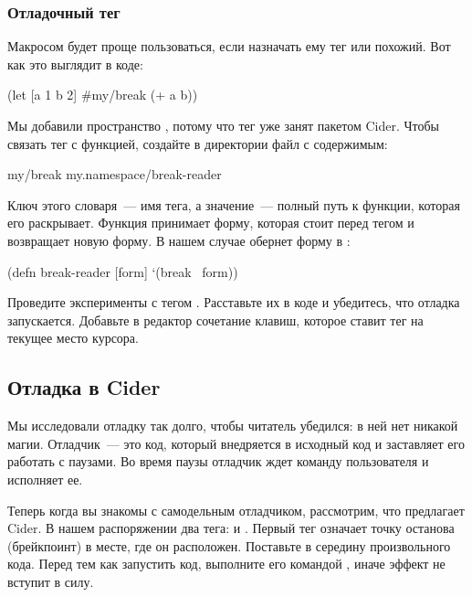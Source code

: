\subsubsection{Отладочный тег}

Макросом  будет проще пользоваться, если назначать ему тег  или похожий. Вот как это выглядит в коде:

\begin{english}
  \begin{clojure}
(let [a 1 b 2]
  #my/break (+ a b))
  \end{clojure}
\end{english}

Мы добавили пространство , потому что тег  уже занят пакетом Cider. Чтобы связать тег с функцией, создайте в директории  файл  с содержимым:

\begin{english}
  \begin{clojure}
{my/break my.namespace/break-reader}
  \end{clojure}
\end{english}

Ключ этого словаря~--- имя тега, а значение~--- полный путь к функции, которая его раскрывает. Функция принимает форму, которая стоит перед тегом и возвращает новую форму. В нашем случае  обернет форму в :

\begin{english}
  \begin{clojure}
(defn break-reader [form]
  `(break ~form))
  \end{clojure}
\end{english}

Проведите эксперименты с тегом . Расставьте их в коде и убедитесь, что отладка запускается. Добавьте в редактор сочетание клавиш, которое ставит тег на текущее место курсора.

\subsection{Отладка в Cider}

Мы исследовали отладку так долго, чтобы читатель убедился: в ней нет никакой магии. Отладчик~--- это код, который внедряется в исходный код и заставляет его работать с паузами. Во время паузы отладчик ждет команду пользователя и исполняет ее.

Теперь когда вы знакомы с самодельным отладчиком, рассмотрим, что предлагает Cider. В нашем распоряжении два тега:  и . Первый тег означает точку останова (брейкпоинт) в месте, где он расположен. Поставьте  в середину произвольного кода. Перед тем как запустить код, выполните его командой , иначе эффект не вступит в силу.

